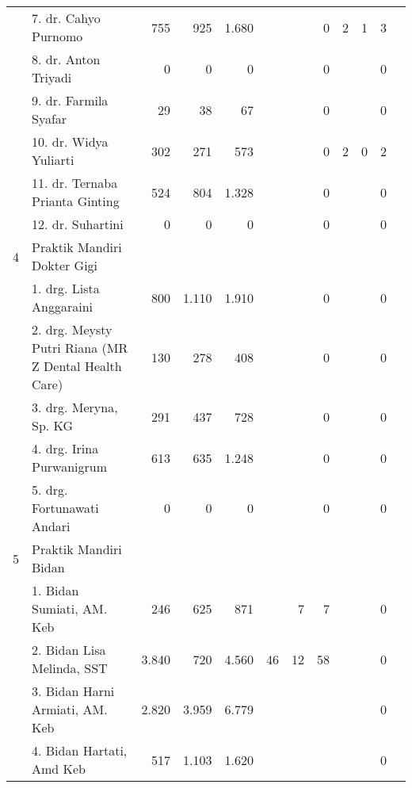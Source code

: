 {\begin{small}
\begin{tabular}{cY{30em}rrrrrrrrrr}
	& 7. dr. Cahyo Purnomo                                 &    755 &    925 &  1.680 &     &     &   0 &   2 &  1 &   3 \\
	& 8. dr. Anton Triyadi                                 &      0 &      0 &      0 &     &     &   0 &     &    &   0 \\
	& 9. dr. Farmila Syafar                                &     29 &     38 &     67 &     &     &   0 &     &    &   0 \\
	& 10. dr. Widya Yuliarti                               &    302 &    271 &    573 &     &     &   0 &   2 &  0 &   2 \\
	& 11. dr. Ternaba Prianta Ginting                      &    524 &    804 &  1.328 &     &     &   0 &     &    &   0 \\
	& 12. dr. Suhartini                                    &      0 &      0 &      0 &     &     &   0 &     &    &   0 \\
	4 & Praktik Mandiri Dokter Gigi & & & & & & & & & \\
	& 1. drg. Lista Anggaraini                             &    800 &  1.110 &  1.910 &     &     &   0 &     &    &   0 \\
	& 2. drg. Meysty Putri Riana (MR Z Dental Health Care) &    130 &    278 &    408 &     &     &   0 &     &    &   0 \\
	& 3. drg. Meryna, Sp. KG                               &    291 &    437 &    728 &     &     &   0 &     &    &   0 \\
	& 4. drg. Irina Purwanigrum                            &    613 &    635 &  1.248 &     &     &   0 &     &    &   0 \\
	& 5. drg. Fortunawati Andari                           &      0 &      0 &      0 &     &     &   0 &     &    &   0 \\
  	5 & Praktik Mandiri Bidan & & & & & & & & & \\
	& 1. Bidan Sumiati, AM. Keb                            &    246 &    625 &    871 &     &   7 &   7 &     &    &   0 \\
	& 2. Bidan Lisa Melinda, SST                           &  3.840 &    720 &  4.560 &  46 &  12 &  58 &     &    &   0 \\
	& 3. Bidan Harni Armiati, AM. Keb                      &  2.820 &  3.959 &  6.779 &     &     &     &     &    &   0 \\
	& 4. Bidan Hartati, Amd Keb                            &    517 &  1.103 &  1.620 &     &     &     &     &    &   0 \\	
    \end{tabular}%
\end{small}

}

